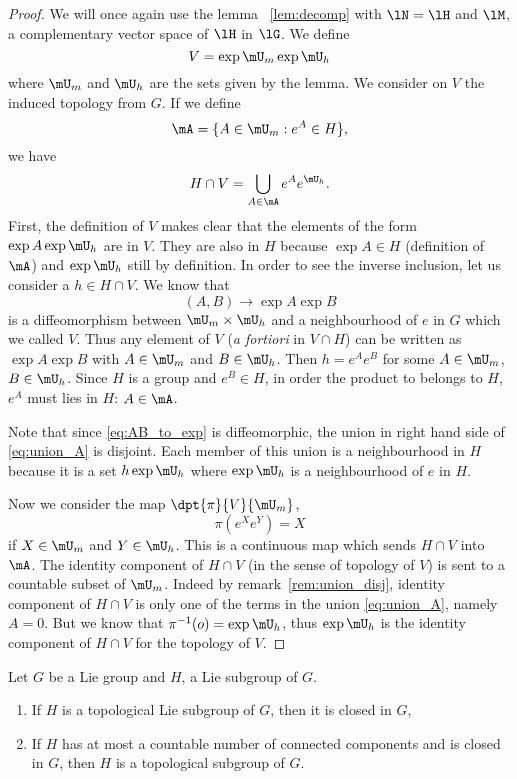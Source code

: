 \begin{proof}
We will once again use the lemma ~\ref{lem:decomp} with $\lN=\lH$ and $\lM$, a complementary vector space of $\lH$ in $\lG$. We define
\[
   V=\exp\mU_m\exp\mU_h
\]
where $\mU_m$ and $\mU_h$ are the sets given by the lemma. We consider on $V$ the induced topology from $G$. If we define
\[
   \mA=\{A\in\mU_m:e^{A}\in H\},
\]
we have
\begin{equation}\label{eq:union_A}
   H\cap V=\bigcup_{A\in\mA}e^{A}e^{\mU_h}.
\end{equation}
First, the definition of $V$ makes clear that the elements of the form $\exp A\exp\mU_h$ are in $V$. They are also in $H$ because $\exp A\in H$ (definition of $\mA$) and $\exp\mU_h$ still by definition. In order to see the inverse inclusion, let us consider a $h\in H\cap V$. We know that
\begin{equation}\label{eq:AB_to_exp}
(A,B)\to\exp A\exp B
\end{equation}
is a diffeomorphism between $\mU_m\times\mU_h$ and a neighbourhood of $e$ in $G$ which we called $V$. Thus any element of $V$ (\emph{a fortiori} in $V\cap H$) can be written as $\exp A\exp B$ with $A\in\mU_m$ and $B\in\mU_h$. Then $h=e^Ae^B$ for some $A\in\mU_m$, $B\in\mU_h$. Since $H$ is a group and $e^B\in H$, in order the product to belongs to $H$, $e^A$ must lies in $H$: $A\in\mA$.

\begin{remark}\label{rem:union_disj}
Note that since \eqref{eq:AB_to_exp} is diffeomorphic, the union in right hand side of \eqref{eq:union_A} is disjoint. Each member of this union is a neighbourhood in $H$ because it is a set $h\exp\mU_h$ where $\exp\mU_h$ is a neighbourhood of $e$ in $H$.
\end{remark}

Now we consider the map $\dpt{\pi}{V}{\mU_m}$,
\[
  \pi(e^{X}e^Y)=X
\]
if $X\in\mU_m$ and $Y\in\mU_h$. This is a continuous map which sends $H\cap V$ into $\mA$. The identity component of $H\cap V$ (in the sense of topology of $V$) is sent to a countable subset of $\mU_m$. Indeed by remark~\ref{rem:union_disj}, identity component of $H\cap V$ is only one of the terms in the union \eqref{eq:union_A}, namely $A=0$. But we know that $\pi^{-1}(o)=\exp\mU_h$, thus $\exp\mU_h$ is the identity component of $H\cap V$ for the topology of $V$.
\end{proof}


\begin{theorem}
Let $G$ be a Lie group and $H$, a Lie subgroup of $G$.
\begin{enumerate}
\item If $H$ is a topological Lie subgroup of $G$, then it is closed in $G$,
\item If $H$ has at most a countable number of connected components and is closed in $G$, then $H$ is a topological subgroup of $G$.
\end{enumerate}
\label{tho:H_ferme}
\end{theorem}

